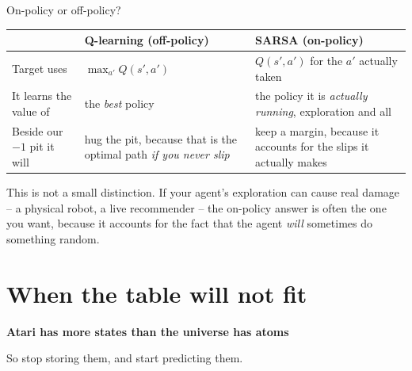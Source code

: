 \documentclass[aspectratio=169]{beamer}
\begin{document}
\begin{frame}{On-policy or off-policy?}
  \begin{center}
  \small
  \begin{tabular}{p{4.2cm} p{4.6cm} p{4.6cm}}
    \toprule
     & \textbf{Q-learning (off-policy)} & \textbf{SARSA (on-policy)} \\
    \midrule
    Target uses & $\max_{a'} Q(s',a')$ & $Q(s', a')$ for the $a'$ actually taken \\[4pt]
    It learns the value of & the \emph{best} policy & the policy it is \emph{actually running},
      exploration and all \\[4pt]
    Beside our $-1$ pit it will & hug the pit, because that is the optimal path \emph{if you
      never slip} & keep a margin, because it accounts for the slips it actually makes \\
    \bottomrule
  \end{tabular}
  \end{center}

  \vskip 10pt
  \begin{tcolorbox}[colback=armorange!12, colframe=armorange, boxrule=0.6pt, arc=2pt]
    \small
    This is not a small distinction. If your agent's exploration can cause real damage -- a
    physical robot, a live recommender -- the on-policy answer is often the one you want,
    because it accounts for the fact that the agent \emph{will} sometimes do something random.
  \end{tcolorbox}
\end{frame}

\section{When the table will not fit}
\begin{frame}[plain]
  \begin{center}
    \vskip 1.6cm
    {\Huge\bfseries\color{popblue}Atari has more states than the universe has atoms}

    \vskip 0.6cm
    {\large So stop storing them, and start predicting them.}
  \end{center}
\end{frame}
\end{document}
